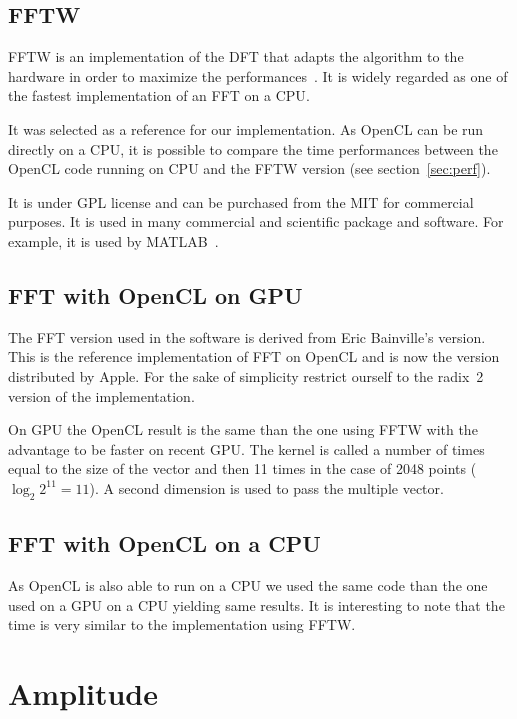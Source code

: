 \subsection{FFTW}

\Gls{FFTW} is an implementation of the \gls{DFT} that adapts the algorithm to the hardware in order to maximize the performances~\cite{fftw05}. It is widely regarded as one of the fastest implementation of an \gls{FFT} on a \gls{CPU}.

It was selected as a reference for our implementation. As \gls{OpenCL} can be run directly on a \gls{CPU}, it is possible to compare the time performances between the \gls{OpenCL} code running on \gls{CPU} and the \gls{FFTW} version (see section~\ref{sec:perf}).

It is under GPL license and can be purchased from the \gls{MIT} for commercial purposes. It is used in many commercial and scientific package and software. For example, it is used by MATLAB~\cite{matlab_fftw}.

\subsection{FFT with OpenCL on GPU}

The \gls{FFT} version used in the software is derived from Eric Bainville's version. This is the reference implementation of \gls{FFT} on \gls{OpenCL} and is now the version distributed by Apple\cite{bainville11}. For the sake of simplicity restrict ourself to the radix~2 version of the implementation.

On \gls{GPU} the \gls{OpenCL} result is the same than the one using \gls{FFTW} with the advantage to be faster on recent \gls{GPU}. The kernel is called a number of times equal to the size of the vector and then 11 times in the case of 2048 points ($\log_{2}{2^{11}} = 11$). A second dimension is used to pass the multiple vector.

\subsection{FFT with OpenCL on a CPU}

As \gls{OpenCL} is also able to run on a \gls{CPU} we used the same code than the one used on a \gls{GPU} on a \gls{CPU} yielding same results. It is interesting to note that the time is very similar to the implementation using \gls{FFTW}.

\section{Amplitude}
\label{sec:amplitude}

